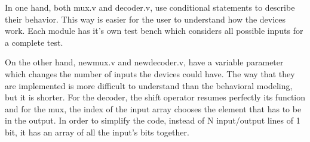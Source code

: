 In one hand, both mux.v and decoder.v, use conditional statements to describe their behavior. This way is easier for the user to understand how the devices work.
Each module has it's own test bench which considers all possible inputs for a complete test.

On the other hand, newmux.v and newdecoder.v, have a variable parameter which changes the number of inputs the devices could have. The way that they are implemented is more difficult to understand than the behavioral modeling, but it is shorter. For the decoder, the shift operator resumes perfectly its function and for the mux, the index of the input array chooses the element that has to be in the output.
In order to simplify the code, instead of N input/output lines of 1 bit, it has an array of all the input's bits together. 
  



